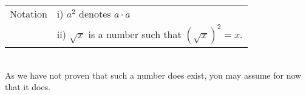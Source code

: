 \hrulefill\\~\\
\begin{tabular}{r l}
    Notation &  i) $a^2$ denotes $a\cdot a$\\
     & ii) $\sqrt{x}$ is a number such that $(\sqrt{x})^2 = x$.\\
\end{tabular}\\
As we have not proven that such a number does exist, you may assume for now that it does.